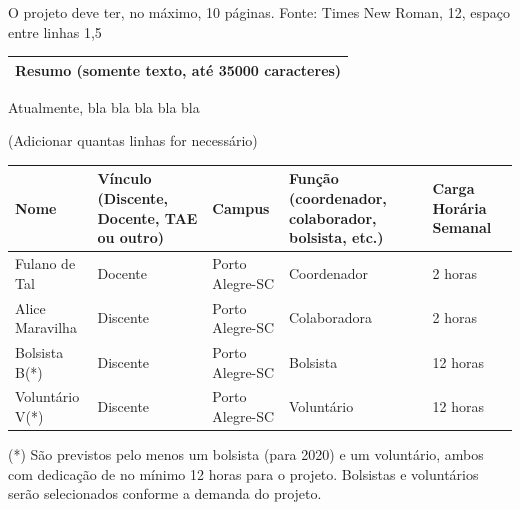 \documentclass[
  11pt,				
  openright,	
  twoside,	
  a4paper,
  brazil,	
  oldfontcommands,
  ]{abntex2}
\begin{document}
{\footnotesize
O projeto deve ter, no máximo, 10 páginas. Fonte: Times New Roman, 12, espaço entre linhas 1,5
}

\begin{table}[H]
\begin{center}
\begin{tabularx}{\textwidth}{|X|}
\hline
{\bf Resumo} {\tiny (somente texto, até 35000 caracteres)}\\\hline
\end{tabularx}
\end{center}
\end{table}
\vspace{-10mm}

Atualmente, bla bla bla bla bla



 (Adicionar quantas linhas for necessário)

\begin{table}[H]
\begin{center}
\begin{tabularx}{\textwidth}{|X|p{2.5cm}|p{3.5cm}|p{3.5cm}|p{1.5cm}|}
\cellcolor{lightgray} {\bf Nome} & \cellcolor{lightgray} \textbf{Vínculo} {\tiny \bf (Discente, Docente, TAE ou outro)} & \cellcolor{lightgray} \textbf{Campus} & \cellcolor{lightgray} \textbf{Função} {\tiny \bf (coordenador, colaborador, bolsista, etc.)}  & \cellcolor{lightgray} \textbf{Carga Horária Semanal} \\\hline
Fulano de Tal		  		           & Docente & Porto Alegre-SC  & Coordenador     & 2 horas \\\hline
Alice Maravilha    		   & Discente & Porto Alegre-SC  & Colaboradora 	  & 2 horas \\\hline
Bolsista B(*)			 	          & Discente & Porto Alegre-SC  & Bolsista & 12 horas \\\hline
Voluntário V(*)		 	                & Discente & Porto Alegre-SC  & Voluntário & 12 horas \\\hline
\end{tabularx}
\end{center}
\end{table}
\vspace{-10mm}
\noindent (*) São previstos pelo menos um bolsista (para 2020) e um voluntário, ambos com dedicação de no mínimo 12 horas para o projeto. Bolsistas e voluntários serão selecionados conforme a demanda do projeto.
\end{document}
